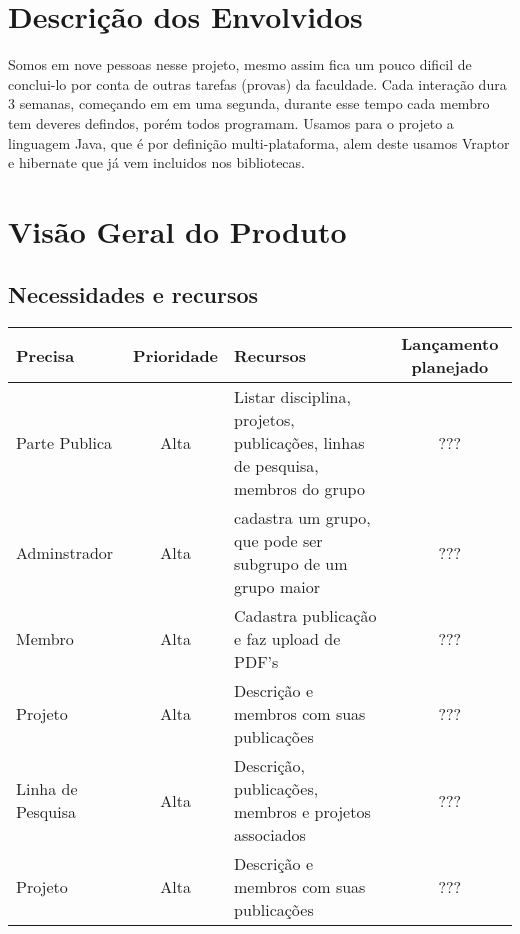 \documentclass[11pt, a4paper]{article}
\begin{document}
    \section{Descrição dos Envolvidos}
        Somos em nove pessoas nesse projeto, mesmo assim fica um pouco dificil de conclui-lo por conta de outras tarefas (provas) da faculdade. Cada interação dura 3 semanas, começando em em uma segunda, durante esse tempo cada membro tem deveres defindos, porém todos programam.
        \indent Usamos para o projeto a linguagem Java, que é por definição multi-plataforma, alem deste usamos Vraptor e hibernate que já vem incluidos nos bibliotecas.
    
    \section{Visão Geral do Produto}
        \subsection{Necessidades e recursos}
            \begin{tabular}{| l | c | p{5cm} | c |}
                \hline
                Precisa & Prioridade & Recursos & Lançamento planejado \\ \hline
                Parte Publica & Alta & Listar disciplina, projetos, publicações, linhas de pesquisa, membros do grupo & ???\\ \hline
                Adminstrador & Alta & cadastra um grupo, que 
                pode ser subgrupo de um grupo maior & ???\\ \hline
                Membro & Alta & Cadastra publicação e faz 
                upload de PDF's & ???\\ \hline
                Projeto & Alta & Descrição e membros com suas 
                publicações & ???\\ \hline
                Linha de Pesquisa & Alta & Descrição, publicações, 
                membros e projetos associados & ???\\ \hline
                Projeto & Alta & Descrição e membros com suas 
                publicações & ???\\ \hline
                \hline
            \end{tabular}
                
            


    
\end{document}
